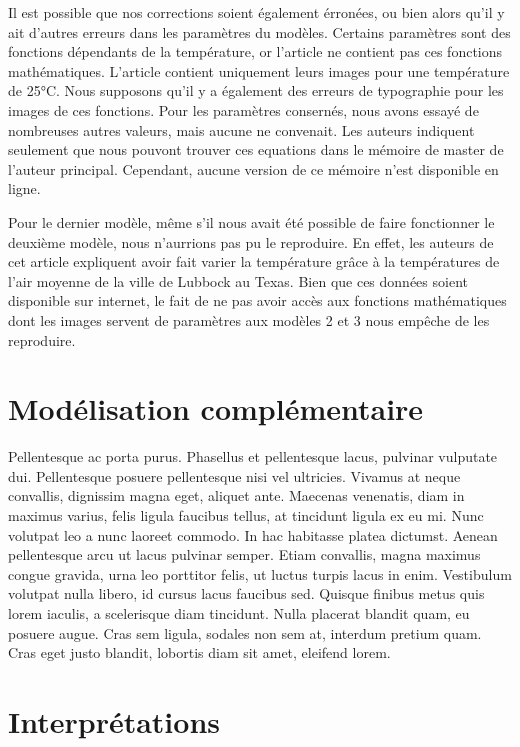 \documentclass[
  12pt,
  french,
  oneside]{article}
\begin{document}
Il est possible que nos corrections soient également érronées, ou bien
alors qu'il y ait d'autres erreurs dans les paramètres du modèles.
Certains paramètres sont des fonctions dépendants de la température, or
l'article ne contient pas ces fonctions mathématiques. L'article
contient uniquement leurs images pour une température de 25°C. Nous
supposons qu'il y a également des erreurs de typographie pour les images
de ces fonctions. Pour les paramètres consernés, nous avons essayé de
nombreuses autres valeurs, mais aucune ne convenait. Les auteurs
indiquent seulement que nous pouvont trouver ces equations dans le
mémoire de master de l'auteur principal. Cependant, aucune version de ce
mémoire n'est disponible en ligne.

Pour le dernier modèle, même s'il nous avait été possible de faire
fonctionner le deuxième modèle, nous n'aurrions pas pu le reproduire. En
effet, les auteurs de cet article expliquent avoir fait varier la
température grâce à la températures de l'air moyenne de la ville de
Lubbock au Texas. Bien que ces données soient disponible sur internet,
le fait de ne pas avoir accès aux fonctions mathématiques dont les
images servent de paramètres aux modèles 2 et 3 nous empêche de les
reproduire.

\hypertarget{moduxe9lisation-compluxe9mentaire}{%
\section{Modélisation
complémentaire}\label{moduxe9lisation-compluxe9mentaire}}

Pellentesque ac porta purus. Phasellus et pellentesque lacus, pulvinar
vulputate dui. Pellentesque posuere pellentesque nisi vel ultricies.
Vivamus at neque convallis, dignissim magna eget, aliquet ante. Maecenas
venenatis, diam in maximus varius, felis ligula faucibus tellus, at
tincidunt ligula ex eu mi. Nunc volutpat leo a nunc laoreet commodo. In
hac habitasse platea dictumst. Aenean pellentesque arcu ut lacus
pulvinar semper. Etiam convallis, magna maximus congue gravida, urna leo
porttitor felis, ut luctus turpis lacus in enim. Vestibulum volutpat
nulla libero, id cursus lacus faucibus sed. Quisque finibus metus quis
lorem iaculis, a scelerisque diam tincidunt. Nulla placerat blandit
quam, eu posuere augue. Cras sem ligula, sodales non sem at, interdum
pretium quam. Cras eget justo blandit, lobortis diam sit amet, eleifend
lorem.

\hypertarget{interpruxe9tations}{%
\section{Interprétations}\label{interpruxe9tations}}
\end{document}
